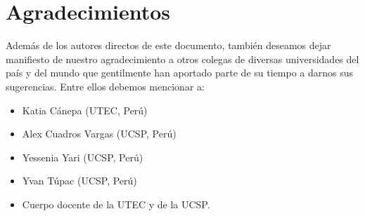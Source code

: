 \chapter*{Agradecimientos}\label{chap:cs-ack}
%

Además de los autores directos de este documento, también deseamos dejar manifiesto de nuestro 
agradecimiento a otros colegas de diversas universidades del paí­s y del mundo que gentilmente 
han aportado parte de su tiempo a darnos sus sugerencias. Entre ellos debemos mencionar a:

\begin{itemize}
\item Katia Cánepa (UTEC, Perú)
\item Alex Cuadros Vargas (UCSP, Perú)
\item Yessenia Yari (UCSP, Perú)
\item Yvan Túpac (UCSP, Perú)
\item Cuerpo docente de la UTEC y de la UCSP.
\end{itemize}

\begin{comment}
\item Sociedad Peruana de Computación por apoyarnos y facilitarnos su documento de Curricula de Computación.
\item Dr. Ernesto Cuadros-Vargas (Universidad Católica de San Pablo, Arequipa) por su invaluable ayuda en la elaboración de la malla propuesta. 
\item Dr. César Beltrán Castañón (IME - Universidad Católica de San Pablo, Arequipa) por su invaluable ayuda en la elaboración de la malla propuesta. 
\item Julieta Flores y Johan Chicana Dí­az por facilitarnos la base de sus estudios de mercado, recolección de datos y tabulación de resultados.
\item Dr. Glen Rodriguez (Universidad Nacional de Ingenierí­a) por su ayuda en la elaboración de la lí­nea de Computación Distribuí­da.
\item Dr. José Luis Segovia (CONCYTEC y Universidad Peruana Cayetano Heredia) por su ayuda en la elaboración de la lí­nea de Interacción Humano-Computador.
\item Dr. Jes\'us Castagnetto (Universidad Peruana Cayetano Heredia) por ayudarnos en la elaboración de la lí­nea de Computación Distribuida y Bio-informática.
\item Dr. Mirko Zimic (Universidad Peruana Cayetano Heredia) por ayudarnos en la elaboración de la lí­nea de Bio-informática.
\item Dr. Bruno Schulze (Laboratorio Nacional de Computa\c{c}\~ao Cientí­fica, Brasil) por su apoyo en la lí­nea de investigación de aplicación de computación distribuida a la bio-informática.
\item Mg. Robinson Oliva (Universidad Nacional de Ingenierí­a) por su ayuda en la elaboración de los cursos relacionados con Arquitectura y Organización
\item Dr. A. M. Coronado (Universidad Nacional de Ingenierí­a) por su apoyo en la lí­nea de investigación de Ciencia Computacional y Métodos Numéricos.
\end{comment}

